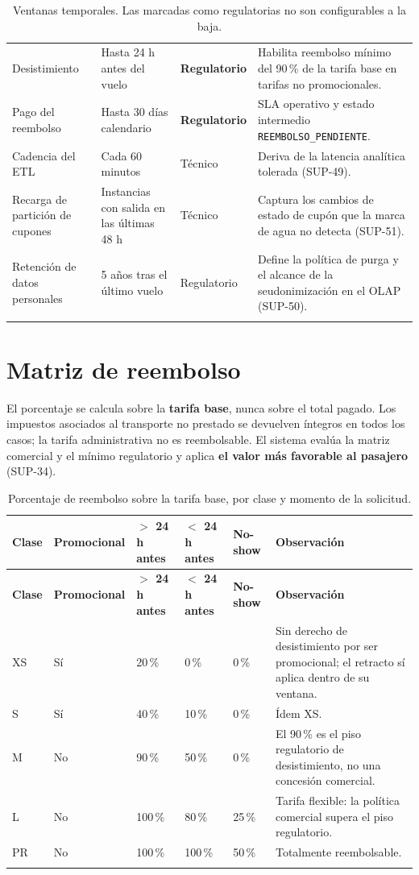 \documentclass[10pt,letterpaper]{article}
\begin{document}
\begin{longtable}{@{}L{4.4cm} L{3.4cm} L{2.0cm} L{5.6cm}@{}}
Desistimiento & Hasta 24 h antes del vuelo & \textbf{Regulatorio} & Habilita reembolso mínimo del 90\,\% de la tarifa base en tarifas no promocionales. \\
Pago del reembolso & Hasta 30 días calendario & \textbf{Regulatorio} & SLA operativo y estado intermedio \texttt{REEMBOLSO\_PENDIENTE}. \\
Cadencia del ETL & Cada 60 minutos & Técnico & Deriva de la latencia analítica tolerada (SUP-49). \\
Recarga de partición de cupones & Instancias con salida en las últimas 48 h & Técnico & Captura los cambios de estado de cupón que la marca de agua no detecta (SUP-51). \\
Retención de datos personales & 5 años tras el último vuelo & Regulatorio & Define la política de purga y el alcance de la seudonimización en el OLAP (SUP-50). \\
\bottomrule
\caption{Ventanas temporales. Las marcadas como regulatorias no son configurables a la baja.}
\end{longtable}

\section{Matriz de reembolso}
\label{sec:reembolso}

El porcentaje se calcula sobre la \textbf{tarifa base}, nunca sobre el total pagado. Los impuestos asociados al transporte no prestado se devuelven íntegros en todos los casos; la tarifa administrativa no es reembolsable. El sistema evalúa la matriz comercial y el mínimo regulatorio y aplica \textbf{el valor más favorable al pasajero} (SUP-34).

\begin{longtable}{@{}L{1.6cm} C{2.0cm} C{2.4cm} C{2.4cm} C{2.2cm} L{4.4cm}@{}}
\toprule
\textbf{Clase} & \textbf{Promo\-cional} & \textbf{$>$ 24 h antes} & \textbf{$<$ 24 h antes} & \textbf{No-show} & \textbf{Observación} \\ \midrule \endfirsthead
\toprule
\textbf{Clase} & \textbf{Promo\-cional} & \textbf{$>$ 24 h antes} & \textbf{$<$ 24 h antes} & \textbf{No-show} & \textbf{Observación} \\ \midrule \endhead
XS & Sí & 20\,\% & 0\,\% & 0\,\% & Sin derecho de desistimiento por ser promocional; el retracto sí aplica dentro de su ventana. \\
S & Sí & 40\,\% & 10\,\% & 0\,\% & Ídem XS. \\
M & No & 90\,\% & 50\,\% & 0\,\% & El 90\,\% es el piso regulatorio de desistimiento, no una concesión comercial. \\
L & No & 100\,\% & 80\,\% & 25\,\% & Tarifa flexible: la política comercial supera el piso regulatorio. \\
PR & No & 100\,\% & 100\,\% & 50\,\% & Totalmente reembolsable. \\
\bottomrule
\caption{Porcentaje de reembolso sobre la tarifa base, por clase y momento de la solicitud.}
\end{longtable}
\end{document}
